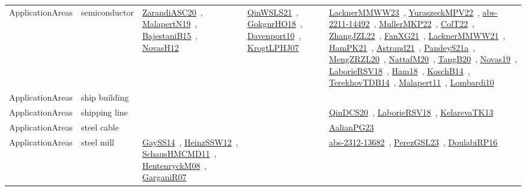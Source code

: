 {\begin{longtable}{lp{3cm}>{\raggedright\arraybackslash}p{6cm}>{\raggedright\arraybackslash}p{6cm}>{\raggedright\arraybackslash}p{8cm}}
ApplicationAreas & semiconductor & \href{works/ZarandiASC20.pdf}{ZarandiASC20}~\cite{ZarandiASC20}, \href{works/MalapertN19.pdf}{MalapertN19}~\cite{MalapertN19}, \href{works/BajestaniB15.pdf}{BajestaniB15}~\cite{BajestaniB15}, \href{works/NovasH12.pdf}{NovasH12}~\cite{NovasH12} & \href{works/QinWSLS21.pdf}{QinWSLS21}~\cite{QinWSLS21}, \href{works/GokgurHO18.pdf}{GokgurHO18}~\cite{GokgurHO18}, \href{works/Davenport10.pdf}{Davenport10}~\cite{Davenport10}, \href{works/KrogtLPHJ07.pdf}{KrogtLPHJ07}~\cite{KrogtLPHJ07} & \href{works/LacknerMMWW23.pdf}{LacknerMMWW23}~\cite{LacknerMMWW23}, \href{works/YuraszeckMPV22.pdf}{YuraszeckMPV22}~\cite{YuraszeckMPV22}, \href{works/abs-2211-14492.pdf}{abs-2211-14492}~\cite{abs-2211-14492}, \href{works/MullerMKP22.pdf}{MullerMKP22}~\cite{MullerMKP22}, \href{works/ColT22.pdf}{ColT22}~\cite{ColT22}, \href{works/ZhangJZL22.pdf}{ZhangJZL22}~\cite{ZhangJZL22}, \href{works/FanXG21.pdf}{FanXG21}~\cite{FanXG21}, \href{works/LacknerMMWW21.pdf}{LacknerMMWW21}~\cite{LacknerMMWW21}, \href{works/HamPK21.pdf}{HamPK21}~\cite{HamPK21}, \href{works/Astrand21.pdf}{Astrand21}~\cite{Astrand21}, \href{works/PandeyS21a.pdf}{PandeyS21a}~\cite{PandeyS21a}, \href{works/MengZRZL20.pdf}{MengZRZL20}~\cite{MengZRZL20}, \href{works/NattafM20.pdf}{NattafM20}~\cite{NattafM20}, \href{works/TangB20.pdf}{TangB20}~\cite{TangB20}, \href{works/Novas19.pdf}{Novas19}~\cite{Novas19}, \href{works/LaborieRSV18.pdf}{LaborieRSV18}~\cite{LaborieRSV18}, \href{works/Ham18.pdf}{Ham18}~\cite{Ham18}, \href{works/KoschB14.pdf}{KoschB14}~\cite{KoschB14}, \href{works/TerekhovTDB14.pdf}{TerekhovTDB14}~\cite{TerekhovTDB14}, \href{works/Malapert11.pdf}{Malapert11}~\cite{Malapert11}, \href{works/Lombardi10.pdf}{Lombardi10}~\cite{Lombardi10}\\
ApplicationAreas & ship building &  &  & \\
ApplicationAreas & shipping line &  &  & \href{works/QinDCS20.pdf}{QinDCS20}~\cite{QinDCS20}, \href{works/LaborieRSV18.pdf}{LaborieRSV18}~\cite{LaborieRSV18}, \href{works/KelarevaTK13.pdf}{KelarevaTK13}~\cite{KelarevaTK13}\\
ApplicationAreas & steel cable &  &  & \href{works/AalianPG23.pdf}{AalianPG23}~\cite{AalianPG23}\\
ApplicationAreas & steel mill & \href{works/GaySS14.pdf}{GaySS14}~\cite{GaySS14}, \href{works/HeinzSSW12.pdf}{HeinzSSW12}~\cite{HeinzSSW12}, \href{works/SchausHMCMD11.pdf}{SchausHMCMD11}~\cite{SchausHMCMD11}, \href{works/HentenryckM08.pdf}{HentenryckM08}~\cite{HentenryckM08}, \href{works/GarganiR07.pdf}{GarganiR07}~\cite{GarganiR07} &  & \href{works/abs-2312-13682.pdf}{abs-2312-13682}~\cite{abs-2312-13682}, \href{works/PerezGSL23.pdf}{PerezGSL23}~\cite{PerezGSL23}, \href{works/DoulabiRP16.pdf}{DoulabiRP16}~\cite{DoulabiRP16}\\

\end{longtable}}
